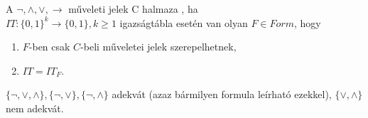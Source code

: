 \begin{frame}

\begin{tcolorbox}[title={Def: Adekvát halmaz}]
A ${\neg}, {\land}, {\lor}, \rightarrow$ műveleti jelek C halmaza , ha\\
$IT: \{0, 1\}^k \rightarrow \{0, 1\}, k \geq 1$ igazságtábla esetén van olyan $F \in Form$, hogy\\
\begin{enumerate}
\item $F$-ben csak $C$-beli műveletei jelek szerepelhetnek,
\item $IT = IT_F$.
\end{enumerate} 
\end{tcolorbox}
\mbigskip

\begin{tcolorbox}[title={Tétel: Adekvát halmazok}]
$\{\neg, \lor, \land\}, \{\neg, \lor\}, \{\neg, \land\}$ adekvát (azaz bármilyen formula leírható ezekkel), $\{\lor, \land\}$ nem adekvát.
\end{tcolorbox}

\end{frame}

